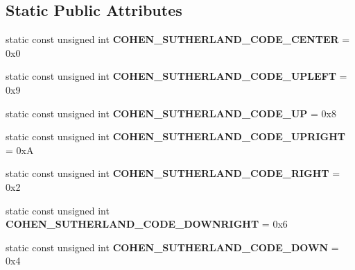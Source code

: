 \subsection*{Static Public Attributes}
\begin{DoxyCompactItemize}
\item 
\hypertarget{classdl32_a_a_b_b2_d_ae7cbd6da48b304814f06a378ebcb7321}{static const unsigned int {\bfseries C\-O\-H\-E\-N\-\_\-\-S\-U\-T\-H\-E\-R\-L\-A\-N\-D\-\_\-\-C\-O\-D\-E\-\_\-\-C\-E\-N\-T\-E\-R} = 0x0}\label{classdl32_a_a_b_b2_d_ae7cbd6da48b304814f06a378ebcb7321}

\item 
\hypertarget{classdl32_a_a_b_b2_d_ac7faeb643c038cba8f4c4b58330a6066}{static const unsigned int {\bfseries C\-O\-H\-E\-N\-\_\-\-S\-U\-T\-H\-E\-R\-L\-A\-N\-D\-\_\-\-C\-O\-D\-E\-\_\-\-U\-P\-L\-E\-F\-T} = 0x9}\label{classdl32_a_a_b_b2_d_ac7faeb643c038cba8f4c4b58330a6066}

\item 
\hypertarget{classdl32_a_a_b_b2_d_a4f45117ef3259d9ec7d6a0c84f676ec6}{static const unsigned int {\bfseries C\-O\-H\-E\-N\-\_\-\-S\-U\-T\-H\-E\-R\-L\-A\-N\-D\-\_\-\-C\-O\-D\-E\-\_\-\-U\-P} = 0x8}\label{classdl32_a_a_b_b2_d_a4f45117ef3259d9ec7d6a0c84f676ec6}

\item 
\hypertarget{classdl32_a_a_b_b2_d_ab4a80cfcc0423a671c17ddd55565482a}{static const unsigned int {\bfseries C\-O\-H\-E\-N\-\_\-\-S\-U\-T\-H\-E\-R\-L\-A\-N\-D\-\_\-\-C\-O\-D\-E\-\_\-\-U\-P\-R\-I\-G\-H\-T} = 0x\-A}\label{classdl32_a_a_b_b2_d_ab4a80cfcc0423a671c17ddd55565482a}

\item 
\hypertarget{classdl32_a_a_b_b2_d_a48960356b488cae9c755ca59ca3d37fe}{static const unsigned int {\bfseries C\-O\-H\-E\-N\-\_\-\-S\-U\-T\-H\-E\-R\-L\-A\-N\-D\-\_\-\-C\-O\-D\-E\-\_\-\-R\-I\-G\-H\-T} = 0x2}\label{classdl32_a_a_b_b2_d_a48960356b488cae9c755ca59ca3d37fe}

\item 
\hypertarget{classdl32_a_a_b_b2_d_a30058dfacf22b88528ddaa11a995ce19}{static const unsigned int {\bfseries C\-O\-H\-E\-N\-\_\-\-S\-U\-T\-H\-E\-R\-L\-A\-N\-D\-\_\-\-C\-O\-D\-E\-\_\-\-D\-O\-W\-N\-R\-I\-G\-H\-T} = 0x6}\label{classdl32_a_a_b_b2_d_a30058dfacf22b88528ddaa11a995ce19}

\item 
\hypertarget{classdl32_a_a_b_b2_d_a07c006f4f686bcf13f548fe1f1142fe1}{static const unsigned int {\bfseries C\-O\-H\-E\-N\-\_\-\-S\-U\-T\-H\-E\-R\-L\-A\-N\-D\-\_\-\-C\-O\-D\-E\-\_\-\-D\-O\-W\-N} = 0x4}\label{classdl32_a_a_b_b2_d_a07c006f4f686bcf13f548fe1f1142fe1}


\end{DoxyCompactItemize}
